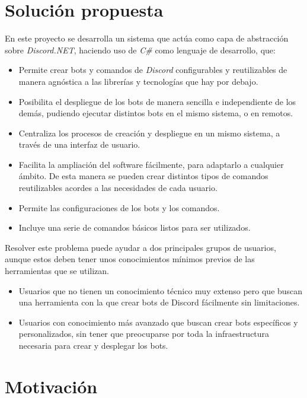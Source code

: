 \section{Solución propuesta}

En este proyecto se desarrolla un sistema que actúa como capa de abstracción sobre \textit{Discord.NET}, haciendo uso de \textit{C\#} como lenguaje de desarrollo, que:

\begin{itemize}
	\item Permite crear bots y comandos de \textit{Discord} configurables y reutilizables de manera agnóstica a las librerías y tecnologías que hay por debajo.
	\item Posibilita el despliegue de los bots de manera sencilla e independiente de los demás, pudiendo ejecutar distintos bots en el mismo sistema, o en remotos.
	\item Centraliza los procesos de creación y despliegue en un mismo sistema, a través de una interfaz de usuario.
	\item Facilita la ampliación del software fácilmente, para adaptarlo a cualquier ámbito. De esta manera se pueden crear distintos tipos de comandos reutilizables acordes a las necesidades de cada usuario.
	\item Permite las configuraciones de los bots y los comandos.
	\item Incluye una serie de comandos básicos listos para ser utilizados.
\end{itemize}

Resolver este problema puede ayudar a dos principales grupos de usuarios, aunque estos deben tener unos conocimientos mínimos previos de las herramientas que se utilizan.

\begin{itemize}
	\item Usuarios que no tienen un conocimiento técnico muy extenso pero que buscan una herramienta con la que crear bots de Discord fácilmente sin limitaciones.
	\item Usuarios con conocimiento más avanzado que buscan crear bots específicos y personalizados, sin tener que preocuparse por toda la infraestructura necesaria para crear y desplegar los bots.
\end{itemize}

\section{Motivación}

